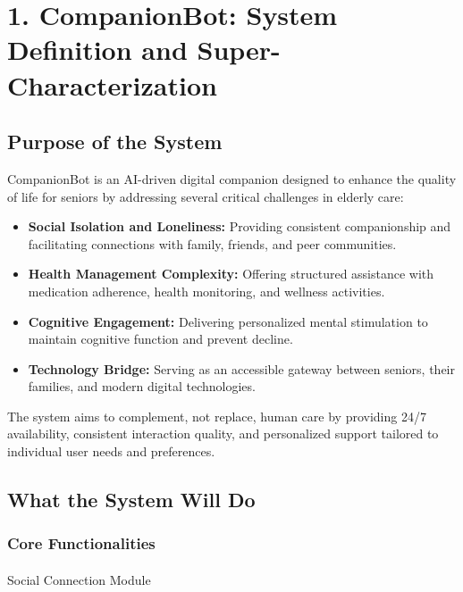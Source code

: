 \documentclass[
  letterpaper,
  DIV=11,
  numbers=noendperiod]{scrartcl}
\makeatletter
\let\oldparagraph\paragraph
\renewcommand{\paragraph}{
    \@ifstar
      \xxxParagraphStar
      \xxxParagraphNoStar
  }
\newcommand{\xxxParagraphStar}[1]{\oldparagraph*{#1}\mbox{}}
\newcommand{\xxxParagraphNoStar}[1]{\oldparagraph{#1}\mbox{}}
\providecommand{\tightlist}{%
  \setlength{\itemsep}{0pt}\setlength{\parskip}{0pt}}\usepackage{longtable,booktabs,array}
\makeatother
\begin{document}
\section{1. CompanionBot: System Definition and
Super-Characterization}\label{companionbot-system-definition-and-super-characterization}

\subsection{Purpose of the System}\label{purpose-of-the-system}

CompanionBot is an AI-driven digital companion designed to enhance the
quality of life for seniors by addressing several critical challenges in
elderly care:

\begin{itemize}
\tightlist
\item
  \textbf{Social Isolation and Loneliness:} Providing consistent
  companionship and facilitating connections with family, friends, and
  peer communities.
\item
  \textbf{Health Management Complexity:} Offering structured assistance
  with medication adherence, health monitoring, and wellness activities.
\item
  \textbf{Cognitive Engagement:} Delivering personalized mental
  stimulation to maintain cognitive function and prevent decline.
\item
  \textbf{Technology Bridge:} Serving as an accessible gateway between
  seniors, their families, and modern digital technologies.
\end{itemize}

The system aims to complement, not replace, human care by providing 24/7
availability, consistent interaction quality, and personalized support
tailored to individual user needs and preferences.

\subsection{What the System Will Do}\label{what-the-system-will-do}

\subsubsection{Core Functionalities}\label{core-functionalities}

\paragraph{Social Connection Module}\label{social-connection-module}
\end{document}
